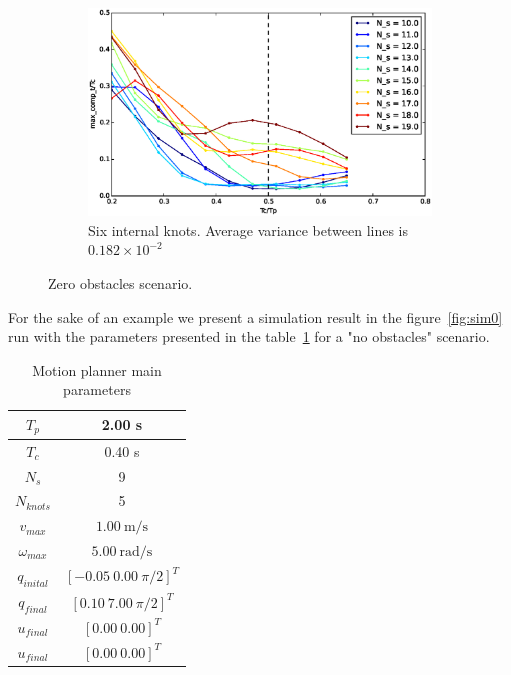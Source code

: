 \begin{figure}[!h]
        ~ %
        \begin{subfigure}[b]{0.48\textwidth}
                \includegraphics[width=\textwidth]{./img/realtime/Scenario_0__N_knots_6/mcttc-tctp.eps}
                \caption{Six internal knots. Average variance between lines is $ 0.182\times 10^{-2}$}\label{fig:uni06}
        \end{subfigure}%
        \caption{Zero obstacles scenario.}\label{fig:uni0}
\end{figure}

For the sake of an example we present a simulation result in the figure~\ref{fig:sim0} run with the parameters presented in the table~\ref{tab:s0param} for a "no obstacles" scenario.

\begin{table}[!h]
\caption {Motion planner main parameters} \label{tab:s0param}
\begin{center}
\begin{tabular}{|c|c|}
\hline
$T_p$ & 2.00 s\\
\hline 
$T_c$ & 0.40 s\\
\hline 
$N_s$ & 9\\
\hline 
$N_{knots}$ & 5\\
\hline
$v_{max}$ & $1.00\ \mathrm{m/s}$\\
\hline
$\omega_{max}$ & $5.00\ \mathrm{rad/s}$\\
\hline
$q_{inital}$ & $[-0.05\ 0.00\ \pi/2]^T$\\
\hline
$q_{final}$ & $[0.10\ 7.00\ \pi/2]^T$\\
\hline
$u_{final}$ & $[0.00\ 0.00]^T$\\
\hline
$u_{final}$ & $[0.00\ 0.00]^T$\\
\hline
\end{tabular}
\end{center}
\end{table}

